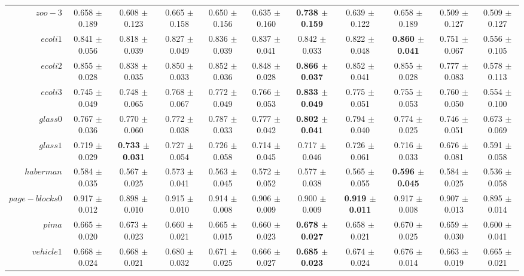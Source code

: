 \begin{table}[!ht]
{\begin{tabular}{r c c c c c c c c c c}
$zoo-3$ & 0.658 $\pm$ 0.189 & 0.608 $\pm$ 0.123 & 0.665 $\pm$ 0.158 & 0.650 $\pm$ 0.156 & 0.635 $\pm$ 0.160 & \textbf{0.738 $\pm$ 0.159} & 0.639 $\pm$ 0.122 & 0.658 $\pm$ 0.189 & 0.509 $\pm$ 0.127 & 0.509 $\pm$ 0.127 \\
$ecoli1$ & 0.841 $\pm$ 0.056 & 0.818 $\pm$ 0.039 & 0.827 $\pm$ 0.049 & 0.836 $\pm$ 0.039 & 0.837 $\pm$ 0.041 & 0.842 $\pm$ 0.033 & 0.822 $\pm$ 0.048 & \textbf{0.860 $\pm$ 0.041} & 0.751 $\pm$ 0.067 & 0.556 $\pm$ 0.105 \\
$ecoli2$ & 0.855 $\pm$ 0.028 & 0.838 $\pm$ 0.035 & 0.850 $\pm$ 0.033 & 0.852 $\pm$ 0.036 & 0.848 $\pm$ 0.028 & \textbf{0.866 $\pm$ 0.037} & 0.852 $\pm$ 0.041 & 0.855 $\pm$ 0.028 & 0.777 $\pm$ 0.083 & 0.578 $\pm$ 0.113 \\
$ecoli3$ & 0.745 $\pm$ 0.049 & 0.748 $\pm$ 0.065 & 0.768 $\pm$ 0.067 & 0.772 $\pm$ 0.049 & 0.766 $\pm$ 0.053 & \textbf{0.833 $\pm$ 0.049} & 0.775 $\pm$ 0.051 & 0.755 $\pm$ 0.053 & 0.760 $\pm$ 0.050 & 0.554 $\pm$ 0.100 \\
$glass0$ & 0.767 $\pm$ 0.036 & 0.770 $\pm$ 0.060 & 0.772 $\pm$ 0.038 & 0.787 $\pm$ 0.033 & 0.777 $\pm$ 0.042 & \textbf{0.802 $\pm$ 0.041} & 0.794 $\pm$ 0.040 & 0.774 $\pm$ 0.025 & 0.746 $\pm$ 0.051 & 0.673 $\pm$ 0.069 \\
$glass1$ & 0.719 $\pm$ 0.029 & \textbf{0.733 $\pm$ 0.031} & 0.727 $\pm$ 0.054 & 0.726 $\pm$ 0.058 & 0.714 $\pm$ 0.045 & 0.717 $\pm$ 0.046 & 0.726 $\pm$ 0.061 & 0.716 $\pm$ 0.033 & 0.676 $\pm$ 0.081 & 0.591 $\pm$ 0.058 \\
$haberman$ & 0.584 $\pm$ 0.035 & 0.567 $\pm$ 0.025 & 0.573 $\pm$ 0.041 & 0.563 $\pm$ 0.045 & 0.572 $\pm$ 0.052 & 0.577 $\pm$ 0.038 & 0.565 $\pm$ 0.055 & \textbf{0.596 $\pm$ 0.045} & 0.584 $\pm$ 0.025 & 0.536 $\pm$ 0.058 \\
$page-blocks0$ & 0.917 $\pm$ 0.012 & 0.898 $\pm$ 0.010 & 0.915 $\pm$ 0.010 & 0.914 $\pm$ 0.008 & 0.906 $\pm$ 0.009 & 0.900 $\pm$ 0.009 & \textbf{0.919 $\pm$ 0.011} & 0.917 $\pm$ 0.008 & 0.907 $\pm$ 0.013 & 0.895 $\pm$ 0.014 \\
$pima$ & 0.665 $\pm$ 0.020 & 0.673 $\pm$ 0.023 & 0.660 $\pm$ 0.021 & 0.665 $\pm$ 0.015 & 0.660 $\pm$ 0.023 & \textbf{0.678 $\pm$ 0.027} & 0.658 $\pm$ 0.021 & 0.670 $\pm$ 0.025 & 0.659 $\pm$ 0.030 & 0.600 $\pm$ 0.041 \\
$vehicle1$ & 0.668 $\pm$ 0.024 & 0.668 $\pm$ 0.021 & 0.680 $\pm$ 0.032 & 0.671 $\pm$ 0.025 & 0.666 $\pm$ 0.027 & \textbf{0.685 $\pm$ 0.023} & 0.674 $\pm$ 0.024 & 0.676 $\pm$ 0.014 & 0.663 $\pm$ 0.019 & 0.665 $\pm$ 0.021 \\

\end{tabular}}
\end{table}
